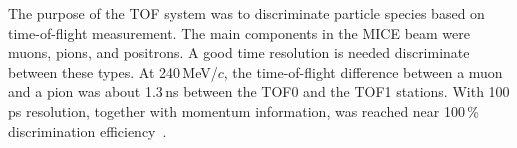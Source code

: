 

The purpose of the TOF system was to discriminate particle species
based on time-of-flight measurement. The main components in the
MICE beam were muons, pions, and positrons.
A good time resolution is needed discriminate between these types.
At 240\,MeV/$c$, the time-of-flight difference between a muon and
a pion was about 1.3\,ns between the TOF0 and the TOF1 stations. With 100\,ps
resolution, together with momentum information, was reached near 100\,\% discrimination efficiency~\cite{Bogomilov:2012sr}.



